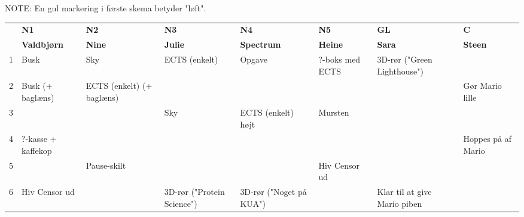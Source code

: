 \documentclass[a4paper,11pt]{article}
\begin{document}
\begin{sketch}

NOTE: En gul markering i første skema betyder "løft".



\begin{landscape}
\begin{table}
  \label{Individuelle}

\begin{tabular}{l||p{2.7cm}|p{2.7cm}|p{2.7cm}|p{2.7cm}|p{2.7cm}|p{2.7cm}|p{2.7cm}|}
    &    \cellcolor[gray]{0.9} \textbf{N1}     &  \cellcolor[gray]{0.9} \textbf{N2}  &      \cellcolor[gray]{0.9} \textbf{N3}       &    \cellcolor[gray]{0.9} \textbf{N4}    &       \cellcolor[gray]{0.9} \textbf{N5}        &             \cellcolor[gray]{0.9} \textbf{GL}              &   \cellcolor[gray]{0.9} \textbf{C}   \\
    & \cellcolor[gray]{0.9} \textbf{Valdbjørn} & \cellcolor[gray]{0.9} \textbf{Nine} &     \cellcolor[gray]{0.9} \textbf{Julie}     & \cellcolor[gray]{0.9} \textbf{Spectrum} &      \cellcolor[gray]{0.9} \textbf{Heine}      &            \cellcolor[gray]{0.9} \textbf{Sara}             & \cellcolor[gray]{0.9} \textbf{Steen} \\ \hline \hline

  \cellcolor[gray]{0.9} 1 &   Busk    & Sky  & ECTS (enkelt) &  \cellcolor{yellow} Opgave  & ?-boks med ECTS & \cellcolor{yellow} 3D-rør ("Green Lighthouse") & \\ \hline

  \cellcolor[gray]{0.9} 2 &   Busk (+ baglæns)    & ECTS (enkelt) (+ baglæns)  & & & & & Gør Mario lille \\ \hline

  \cellcolor[gray]{0.9} 3 & & & Sky & \cellcolor{yellow} ECTS (enkelt) højt & Mursten & & \\ \hline

  \cellcolor[gray]{0.9} 4 & ?-kasse + kaffekop & & & & & & \cellcolor{yellow} Hoppes på af Mario \\ \hline

  \cellcolor[gray]{0.9} 5 & & Pause-skilt & & & Hiv Censor ud & & \\ \hline

  \cellcolor[gray]{0.9} 6 & Hiv Censor ud & & \cellcolor{yellow} 3D-rør ("Protein Science") & \cellcolor{yellow} 3D-rør ("Noget på KUA") & & Klar til at give Mario piben & \\ \hline


\end{tabular}
\end{table}
\end{landscape}
\end{sketch}
\end{document}
